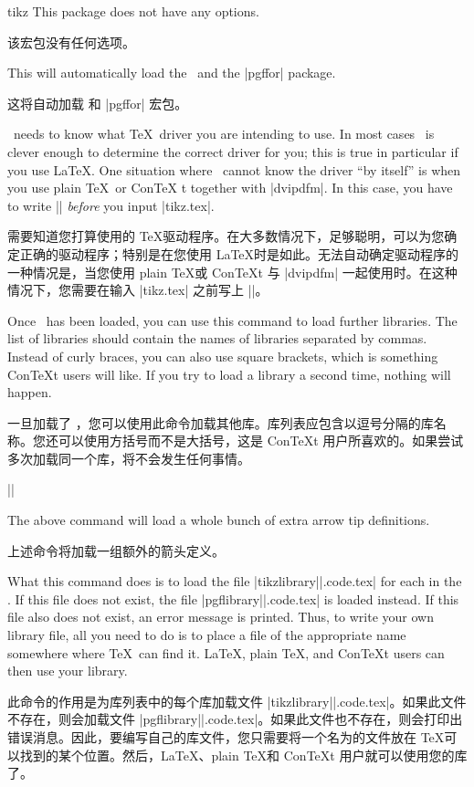 \begin{package}{tikz}
  This package does not have any options.

  该宏包没有任何选项。

  This will automatically load the \pgfname\ and the |pgffor| package.

  这将自动加载 \pgfname 和 |pgffor| 宏包。

  \pgfname\ needs to know what \TeX\ driver you are intending to use. In most
  cases \pgfname\ is clever enough to determine the correct driver for you;
  this is true in particular if you use \LaTeX. One situation where \pgfname\
  cannot know the driver ``by itself'' is when you use plain \TeX\ or Con\TeX
  t together with |dvipdfm|. In this case, you have to write
  |\def\pgfsysdriver{pgfsys-dvipdfm.def}| \emph{before} you input |tikz.tex|.

  \pgfname 需要知道您打算使用的 \TeX 驱动程序。在大多数情况下，\pgfname 足够聪明，可以为您确定正确的驱动程序；特别是在您使用 \LaTeX 时是如此。\pgfname 无法自动确定驱动程序的一种情况是，当您使用 plain \TeX 或 Con\TeX t 与 |dvipdfm| 一起使用时。在这种情况下，您需要在输入 |tikz.tex| 之前写上 |\def\pgfsysdriver{pgfsys-dvipdfm.def}|。
\end{package}

\begin{command}{\usetikzlibrary{}}
  Once \tikzname\ has been loaded, you can use this command to load further
  libraries. The list of libraries should contain the names of libraries
  separated by commas. Instead of curly braces, you can also use square
  brackets, which is something Con\TeX t users will like. If you try to load
  a library a second time, nothing will happen.

  一旦加载了 \tikzname ，您可以使用此命令加载其他库。库列表应包含以逗号分隔的库名称。您还可以使用方括号而不是大括号，这是 Con\TeX t 用户所喜欢的。如果尝试多次加载同一个库，将不会发生任何事情。

  \example |\usetikzlibrary{arrows.meta}|

  The above command will load a whole bunch of extra arrow tip definitions.

  上述命令将加载一组额外的箭头定义。

  What this command does is to load the file
  |tikzlibrary||.code.tex| for each  in the
  \meta{list of libraries}. If this file does not exist, the file
  |pgflibrary|\meta{library}|.code.tex| is loaded instead. If this file also
  does not exist, an error message is printed. Thus, to write your own
  library file, all you need to do is to place a file of the appropriate name
  somewhere where \TeX\ can find it. \LaTeX, plain \TeX, and Con\TeX t users
  can then use your library.

  此命令的作用是为库列表中的每个库加载文件 |tikzlibrary||.code.tex|。如果此文件不存在，则会加载文件 |pgflibrary||.code.tex|。如果此文件也不存在，则会打印出错误消息。因此，要编写自己的库文件，您只需要将一个名为的文件放在 \TeX 可以找到的某个位置。然后，\LaTeX、plain \TeX 和 Con\TeX t 用户就可以使用您的库了。
\end{command}


